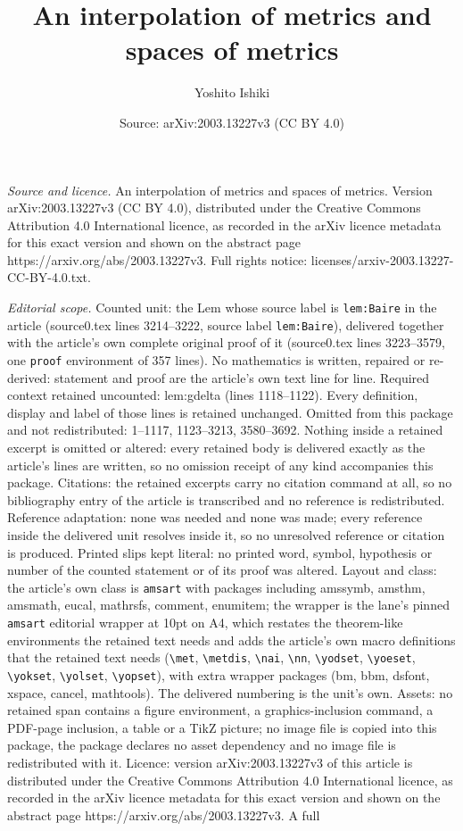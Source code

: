 \documentclass[10pt,a4paper]{amsart}
\title[An interpolation of metrics and spaces of metrics]{An interpolation of metrics and spaces of metrics}
\author{Yoshito Ishiki}
\date{Source: arXiv:2003.13227v3 (CC BY 4.0)}
\begin{document}
\maketitle

\noindent\emph{Source and licence.} An interpolation of metrics and spaces of metrics. Version arXiv:2003.13227v3 (CC BY 4.0), distributed under the Creative Commons Attribution 4.0 International licence, as recorded in the arXiv licence metadata for this exact version and shown on the abstract page https://arxiv.org/abs/2003.13227v3. Full rights notice: licenses/arxiv-2003.13227-CC-BY-4.0.txt.\par\smallskip

\noindent\textit{Editorial scope.} Counted unit: the Lem whose source label is \texttt{lem:Baire} in the article (source0.tex lines 3214--3222, source label \texttt{lem:Baire}), delivered together with the article's own complete original proof of it (source0.tex lines 3223--3579, one \texttt{proof} environment of 357 lines). No mathematics is written, repaired or re-derived: statement and proof are the article's own text line for line. Required context retained uncounted: lem:gdelta (lines 1118--1122). Every definition, display and label of those lines is retained unchanged. Omitted from this package and not redistributed: 1--1117, 1123--3213, 3580--3692. Nothing inside a retained excerpt is omitted or altered: every retained body is delivered exactly as the article's lines are written, so no omission receipt of any kind accompanies this package. Citations: the retained excerpts carry no citation command at all, so no bibliography entry of the article is transcribed and no reference is redistributed. Reference adaptation: none was needed and none was made; every reference inside the delivered unit resolves inside it, so no unresolved reference or citation is produced. Printed slips kept literal: no printed word, symbol, hypothesis or number of the counted statement or of its proof was altered. Layout and class: the article's own class is \texttt{amsart} with packages including amssymb, amsthm, amsmath, eucal, mathrsfs, comment, enumitem; the wrapper is the lane's pinned \texttt{amsart} editorial wrapper at 10pt on A4, which restates the theorem-like environments the retained text needs and adds the article's own macro definitions that the retained text needs (\texttt{\textbackslash met}, \texttt{\textbackslash metdis}, \texttt{\textbackslash nai}, \texttt{\textbackslash nn}, \texttt{\textbackslash yodset}, \texttt{\textbackslash yoeset}, \texttt{\textbackslash yokset}, \texttt{\textbackslash yolset}, \texttt{\textbackslash yopset}), with extra wrapper packages (bm, bbm, dsfont, xspace, cancel, mathtools). The delivered numbering is the unit's own. Assets: no retained span contains a figure environment, a graphics-inclusion command, a PDF-page inclusion, a table or a TikZ picture; no image file is copied into this package, the package declares no asset dependency and no image file is redistributed with it. Licence: version arXiv:2003.13227v3 of this article is distributed under the Creative Commons Attribution 4.0 International licence, as recorded in the arXiv licence metadata for this exact version and shown on the abstract page https://arxiv.org/abs/2003.13227v3. A full 
\end{document}
